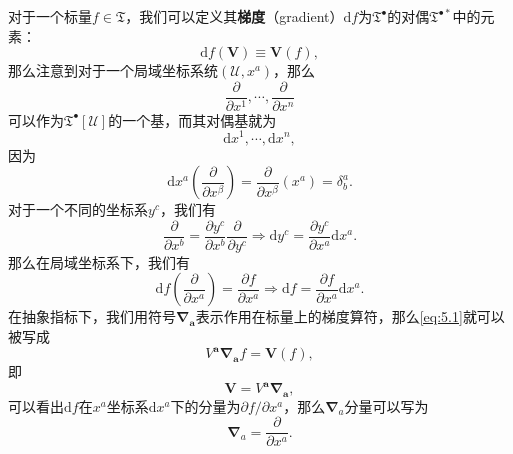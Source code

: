 对于一个标量$f\in \mathfrak{T}$，我们可以定义其\textbf{梯度}（gradient）$\mathrm{d} f$为$\mathfrak{T}^{\bullet }$的对偶$\mathfrak{T}^{\bullet *}$中的元素：
\begin{equation}
	\mathrm{d} f(\boldsymbol{V}) \equiv \boldsymbol{V}( f) ,
	\label{eq:5.1}
\end{equation}
那么注意到对于一个局域坐标系统$(\mathcal{U} ,x^{a} )$，那么
\begin{equation*}
	\frac{\partial }{\partial x^{1}} ,\cdots ,\frac{\partial }{\partial x^{n}}
\end{equation*}
可以作为$\mathfrak{T}^{\bullet }[\mathcal{U}]$的一个基，而其对偶基就为
\begin{equation*}
	\mathrm{d} x^{1} ,\cdots ,\mathrm{d} x^{n} ,
\end{equation*}
因为
\begin{equation*}
	\mathrm{d} x^{a}\left(\frac{\partial }{\partial x^{\beta }}\right) =\frac{\partial }{\partial x^{\beta }} (x^{a} )=\delta _{b}^{a} .
\end{equation*}
对于一个不同的坐标系$y^{c}$，我们有
\begin{equation*}
	\frac{\partial }{\partial x^{b}} =\frac{\partial y^{c}}{\partial x^{b}}\frac{\partial }{\partial y^{c}} \Rightarrow \mathrm{d} y^{c} =\frac{\partial y^{c}}{\partial x^{a}}\mathrm{d} x^{a} .
\end{equation*}
那么在局域坐标系下，我们有
\begin{equation*}
	\mathrm{d} f\left(\frac{\partial }{\partial x^{a}}\right) =\frac{\partial f}{\partial x^{a}}\mathrm{\Rightarrow d} f=\frac{\partial f}{\partial x^{a}}\mathrm{d} x^{a} .
\end{equation*}
在抽象指标下，我们用符号$\boldsymbol{\nabla }_{\boldsymbol{a}}$表示作用在标量上的梯度算符，那么\ref{eq:5.1}就可以被写成
\begin{equation*}
	V^{\boldsymbol{a}}\boldsymbol{\nabla }_{\boldsymbol{a}} f=\boldsymbol{V}( f) ,
\end{equation*}
即
\begin{equation}
	\boldsymbol{V} =V^{\boldsymbol{a}}\boldsymbol{\nabla }_{\boldsymbol{a}} ,
	\label{eq:5.2}
\end{equation}
可以看出$\mathrm{d} f$在$x^{a}$坐标系$\mathrm{d} x^{a}$下的分量为$\partial f/\partial x^{a}$，那么$\boldsymbol{\nabla }_{a}$分量可以写为
\begin{equation*}
	\boldsymbol{\nabla }_{a} =\frac{\partial }{\partial x^{a}} .
\end{equation*}


